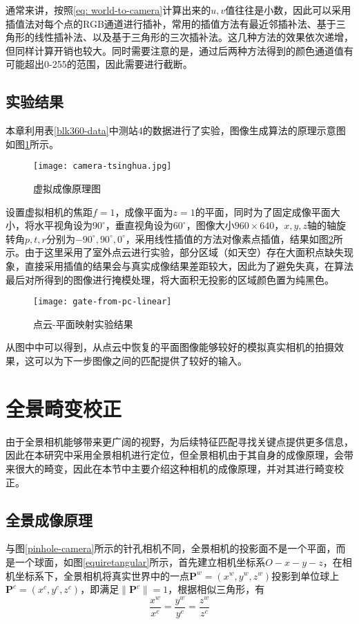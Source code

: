 通常来讲，按照\ref{eq: world-to-camera}计算出来的$u, v$值往往是小数，因此可以采用插值法对每个点的RGB通道进行插补，常用的插值方法有最近邻插补法、基于三角形的线性插补法、以及基于三角形的三次插补法。这几种方法的效果依次递增，但同样计算开销也较大。同时需要注意的是，通过后两种方法得到的颜色通道值有可能超出0-255的范围，因此需要进行截断。

\subsection{实验结果}
本章利用表\ref{blk360-data}中测站4的数据进行了实验，图像生成算法的原理示意图如图\ref{camera-tsinghua}所示。
\begin{figure}
	\centering
	\texttt{[image: camera-tsinghua.jpg]}
	\caption{虚拟成像原理图}
	\label{camera-tsinghua}
\end{figure}

设置虚拟相机的焦距$f=1$，成像平面为$z=1$的平面，同时为了固定成像平面大小，将水平视角设为$90^\circ$，垂直视角设为$60^\circ$，图像大小$960\times640$，$x,y,z$轴的轴旋转角$p,t,r$分别为$-90^\circ,90^\circ,0^\circ$，采用线性插值的方法对像素点插值，结果如图\ref{gate-from-pc-linear}所示。由于这里采用了室外点云进行实验，部分区域（如天空）存在大面积点缺失现象，直接采用插值的结果会与真实成像结果差距较大，因此为了避免失真，在算法最后对所得到的图像进行掩模处理，将大面积无投影的区域颜色置为纯黑色。
\begin{figure}
	\centering
	\texttt{[image: gate-from-pc-linear]}
	\caption{点云-平面映射实验结果}
	\label{gate-from-pc-linear}
\end{figure}

从图中中可以得到，从点云中恢复的平面图像能够较好的模拟真实相机的拍摄效果，这可以为下一步图像之间的匹配提供了较好的输入。

\section{全景畸变校正}
由于全景相机能够带来更广阔的视野，为后续特征匹配寻找关键点提供更多信息，因此在本研究中采用全景相机进行定位，但全景相机由于其自身的成像原理，会带来很大的畸变，因此在本节中主要介绍这种相机的成像原理，并对其进行畸变校正。
\subsection{全景成像原理}
与图\ref{pinhole-camera}所示的针孔相机不同，全景相机的投影面不是一个平面，而是一个球面，如图\ref{equiretangular}所示，首先建立相机坐标系$O-x-y-z$，在相机坐标系下，全景相机将真实世界中的一点$\boldsymbol{P}^w=(x^w, y^w, z^w)$投影到单位球上$\boldsymbol{P}^c=(x^c,y^c,z^c)$，即满足$\|\boldsymbol{P}^c\|=1$，根据相似三角形，有
\begin{equation}
	\dfrac{x^w}{x^c} = \dfrac{y^w}{y^c} = \dfrac{z^w}{z^c}
\end{equation}

